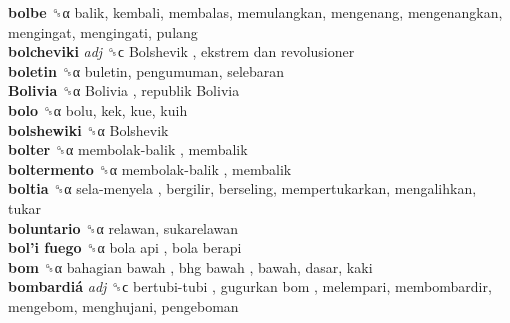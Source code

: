 \textbf{bolbe} ␝α  balik, kembali, membalas, memulangkan, mengenang, mengenangkan, mengingat, mengingati, pulang  \\
\textbf{bolcheviki} \emph{adj}  ␝ϲ   Bolshevik ,  ekstrem dan revolusioner   \\
\textbf{boletin} ␝α  buletin, pengumuman, selebaran  \\
\textbf{Bolivia} ␝α   Bolivia ,  republik Bolivia   \\
\textbf{bolo} ␝α  bolu, kek, kue, kuih  \\
\textbf{bolshewiki} ␝α   Bolshevik   \\
\textbf{bolter} ␝α   membolak-balik , membalik  \\
\textbf{boltermento} ␝α   membolak-balik , membalik  \\
\textbf{boltia} ␝α   sela-menyela , bergilir, berseling, mempertukarkan, mengalihkan, tukar  \\
\textbf{boluntario} ␝α  relawan, sukarelawan  \\
\textbf{bol’i fuego} ␝α   bola api ,  bola berapi   \\
\textbf{bom} ␝α   bahagian bawah ,  bhg bawah , bawah, dasar, kaki  \\
\textbf{bombardiá} \emph{adj}  ␝ϲ   bertubi-tubi ,  gugurkan bom , melempari, membombardir, mengebom, menghujani, pengeboman  \\
